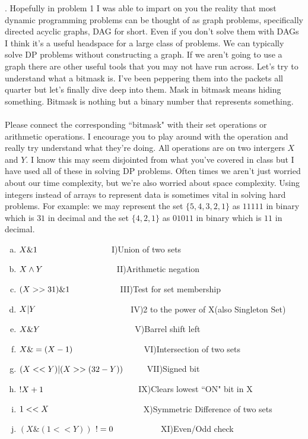 \documentclass[12pt]{article}
\newcommand\tab[1][1cm]{\hspace*{#1}}
\begin{document}
\newpage
{}. Hopefully in problem 1 I was able to impart on you the reality that most dynamic 
programming problems can be thought of as graph problems, specifically directed acyclic graphs, 
DAG for short. Even if you don't solve them with DAGs I think it's a useful headspace for a large class of problems. 
We can typically solve DP problems without constructing a graph. If we aren't going to use a graph there are other useful
tools that you may not have run across. Let's try to understand what a bitmask is. I've been peppering
them into the packets all quarter but let's finally dive deep into them. Mask in bitmask means hiding 
something. Bitmask is nothing but a binary number that represents something.\\\\
Please connect the corresponding ``bitmask" with their
set operations or arithmetic operations. I encourage you to 
play around with the operation and really try understand what
they're doing. All operations are on two intergers $X$ and $Y$. 
I know this may seem disjointed from what you've covered in
class but I have used all of these in solving DP problems. 
Often times we aren't just worried about our time complexity,
but we're also worried about space complexity. Using integers
instead of arrays to represent data is sometimes vital in solving
hard problems. For example: we may represent the set $\{5,4,3,2,1\}$ 
as $11111$ in binary which is $31$ in decimal and the set $\{4,2,1\}$ 
as $01011$ in binary which is $11$ in decimal.
\begin{enumerate}[a)]
    \item  $X \& 1 \tab\tab\tab$ I)Union of two sets
    \item  $X \wedge Y \tab\tab\tab$ II)Arithmetic negation
    \item  $ (X >> 31) \& 1 \tab\tab$ III)Test for set membership
    \item  $X | Y \tab\tab\tab\tab$IV)2 to the power of X(also Singleton Set)
    \item  $X \& Y \tab\tab\tab\tab$V)Barrel shift left
    \item  $X \&= (X - 1) \tab\tab\tab$VI)Intersection of two sets
    \item  $(X<<Y) | (X >> (32 - Y))\tab$VII)Signed bit
    \item  $ ! X + 1 \tab\tab\tab\tab$IX)Clears lowest ``ON" bit in X
    \item  $1 << X \tab\tab\tab\tab$X)Symmetric Difference of two sets
    \item  $(X \& (1 << Y))$ $!= 0 \tab\tab$XI)Even/Odd check 
    \end{enumerate}
\end{document}
